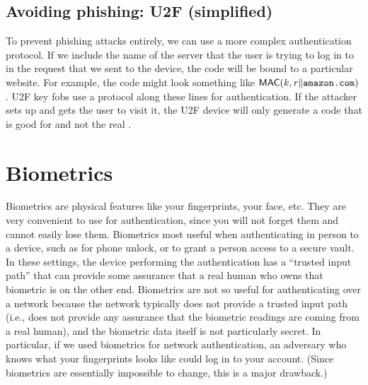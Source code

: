 \subsection{Avoiding phishing: U2F (simplified)}
To prevent phishing attacks entirely, we can use a more complex authentication protocol.
If we include the name of the server that the user is trying to log in to in the request that we sent to the device,
the code will be bound to a particular website.
For example, the code might look something like $\MAC(k, r\|\ttt{amazon.com})$.
U2F key fobs use a protocol along these lines for authentication.
If the attacker sets up  and gets the user to visit it,
the U2F device will only generate a code that is good for 
and not the real . 
	
\section{Biometrics}
Biometrics are physical features like your fingerprints, your face, etc.
They are very convenient to use for authentication, since you will not forget them and cannot easily lose them.
Biometrics most useful when authenticating in person to a device, such as for phone unlock, or
to grant a person access to a secure vault.
In these settings, the device performing the authentication has a ``trusted input path''
that can provide some assurance that a real human who owns that biometric is on the other end.
Biometrics are not so useful for authenticating over a network because the network typically
does not provide a trusted input path (i.e., does not provide any assurance that the biometric
readings are coming from a real human), and the biometric data itself is not particularly secret.
In particular, if we used biometrics for network authentication,
an adversary who knows what your fingerprints looks like could log in to your account.
(Since biometrics are essentially impossible to change, this is a major drawback.)
